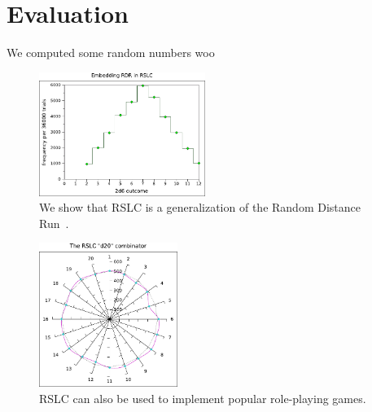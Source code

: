 \documentclass[10pt]{sigplanconf}
\begin{document}
\section{Evaluation}

We computed some random numbers woo

\begin{figure}[t]
	\begin{center}
	\includegraphics[width=0.48\textwidth]{rslc-rdr.pdf}
	\end{center}
	\caption{We show that RSLC is a generalization of the Random Distance Run~\cite{rdr}.}
	\label{fig:rdr}
\end{figure}

\begin{figure}[t]
	\begin{center}
	\includegraphics[width=0.40\textwidth]{rslc-d20.pdf}
	\end{center}
	\caption{RSLC can also be used to implement popular role-playing games.}
	\label{fig:rdr}
\end{figure}




\appendix
\end{document}
